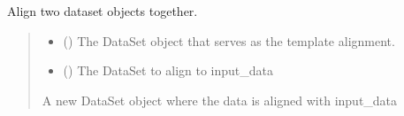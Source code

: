\documentclass[letterpaper,10pt,english]{sphinxmanual}
\begin{document}
\begin{fulllineitems}
\label{\detokenize{modules:cubespa.overlays.align_image}}
\pysigstartsignatures
{}
\pysigstopsignatures
\sphinxAtStartPar
Align two dataset objects together.
\begin{quote}\begin{description}
\begin{itemize}
\item {} 
\sphinxAtStartPar
{} ({\hyperref[\detokenize{modules:cubespa.data.DataSet}]{}}) \textendash{} The DataSet object that serves as the template alignment.

\item {} 
\sphinxAtStartPar
{} ({\hyperref[\detokenize{modules:cubespa.data.DataSet}]{}}) \textendash{} The DataSet to align to input\_data

\end{itemize}

\sphinxAtStartPar
A new DataSet object where the data is aligned with input\_data

\sphinxAtStartPar
{\hyperref[\detokenize{modules:cubespa.data.DataSet}]{}}

\end{description}\end{quote}

\end{fulllineitems}

\label{\detokenize{modules:module-cubespa.spectra}}
\end{document}
